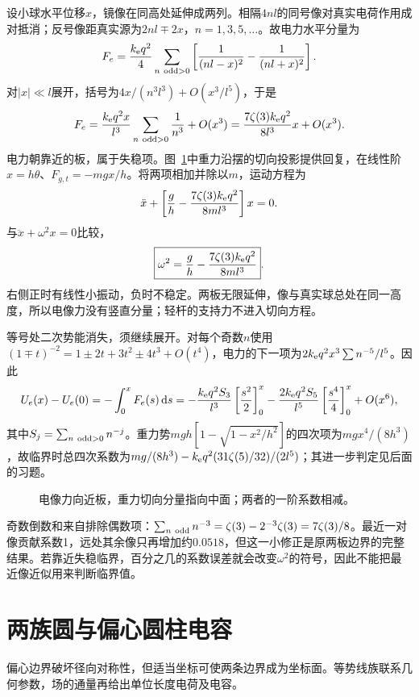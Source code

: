 \begin{solution}
设小球水平位移$x$，镜像在同高处延伸成两列。相隔$4nl$的同号像对真实电荷作用成对抵消；反号像距真实源为$2nl\mp2x$，$n=1,3,5,\ldots$。故电力水平分量为
\[F_e=\frac{k_{\rm e} q^2}{4}\sum_{n\ {\rm odd}>0}
\left[\frac1{(nl-x)^2}-\frac1{(nl+x)^2}\right].\]
对$|x|\ll l$展开，括号为$4x/(n^3l^3)+O(x^3/l^5)$，于是
\[F_e=\frac{k_{\rm e} q^2x}{l^3}\sum_{n\ {\rm odd}>0}\frac1{n^3}+O(x^3)
=\frac{7\zeta(3)k_{\rm e} q^2}{8l^3}x+O(x^3).
\]
电力朝靠近的板，属于失稳项。图~\ref{fig:es3-e7-s}中重力沿摆的切向投影提供回复，在线性阶$x=h\theta$、$F_{g,t}=-mgx/h$。将两项相加并除以$m$，运动方程为
\[\ddot x+\left[\frac gh-\frac{7\zeta(3)k_{\rm e} q^2}{8ml^3}\right]x=0.\]
与$\ddot x+\omega^2x=0$比较，
\[\boxed{\omega^2=\frac gh-\frac{7\zeta(3)k_{\rm e} q^2}{8ml^3}}.
\]
右侧正时有线性小振动，负时不稳定。两板无限延伸，像与真实球总处在同一高度，所以电像力没有竖直分量；轻杆的支持力不进入切向方程。

等号处二次势能消失，须继续展开。对每个奇数$n$使用$(1\mp t)^{-2}=1\pm2t+3t^2\pm4t^3+O(t^4)$，电力的下一项为$2k_{\rm e} q^2x^3\sum n^{-5}/l^5$。因此
\[U_e(x)-U_e(0)=-\int_0^xF_e(s)\mathop{}\!\mathrm d s
=-\frac{k_{\rm e} q^2S_3}{l^3}\left[\frac{s^2}2\right]_0^x
-\frac{2k_{\rm e} q^2S_5}{l^5}\left[\frac{s^4}4\right]_0^x+O(x^6),\]
其中$S_j=\sum_{n\ {\rm odd}>0}n^{-j}$。重力势$mgh[1-\sqrt{1-x^2/h^2}]$的四次项为$mgx^4/(8h^3)$，故临界时总四次系数为$mg/(8h^3)-k_{\rm e} q^2(31\zeta(5)/32)/(2l^5)$；其进一步判定见后面的习题。
\begin{figure}[H]\centering
{}
\caption{电像力向近板，重力切向分量指向中面；两者的一阶系数相减。}\label{fig:es3-e7-s}
\end{figure}


奇数倒数和来自排除偶数项：$\sum_{n\ {\rm odd}}n^{-3}=\zeta(3)-2^{-3}\zeta(3)=7\zeta(3)/8$。最近一对像贡献系数1，远处其余像只再增加约$0.0518$，但这一小修正是原两板边界的完整结果。若靠近失稳临界，百分之几的系数误差就会改变$\omega^2$的符号，因此不能把最近像近似用来判断临界值。
\end{solution}

\section{两族圆与偏心圆柱电容}\label{sec:es3-capacitance}
偏心边界破坏径向对称性，但适当坐标可使两条边界成为坐标面。等势线族联系几何参数，场的通量再给出单位长度电荷及电容。

